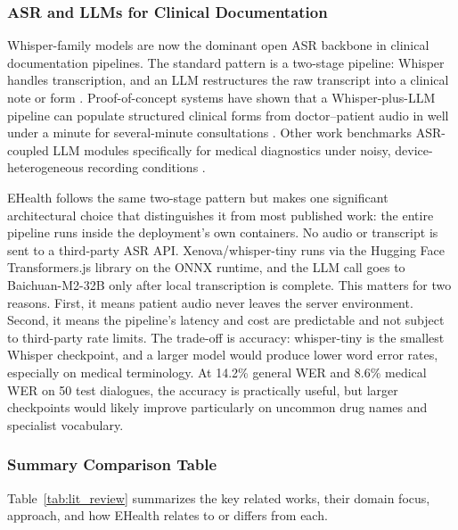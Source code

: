 \subsubsection{ASR and LLMs for Clinical Documentation}

Whisper-family models are now the dominant open ASR backbone in clinical documentation pipelines. The standard pattern is a two-stage pipeline: Whisper handles transcription, and an LLM restructures the raw transcript into a clinical note or form \cite{asr_healthcare_2026}. Proof-of-concept systems have shown that a Whisper-plus-LLM pipeline can populate structured clinical forms from doctor--patient audio in well under a minute for several-minute consultations \cite{llm_transcription_2024}. Other work benchmarks ASR-coupled LLM modules specifically for medical diagnostics under noisy, device-heterogeneous recording conditions \cite{asr_llm_benchmarking_2025}.

\noindent EHealth follows the same two-stage pattern but makes one significant architectural choice that distinguishes it from most published work: the entire pipeline runs inside the deployment's own containers. No audio or transcript is sent to a third-party ASR API. Xenova/whisper-tiny runs via the Hugging Face Transformers.js library on the ONNX runtime, and the LLM call goes to Baichuan-M2-32B only after local transcription is complete. This matters for two reasons. First, it means patient audio never leaves the server environment. Second, it means the pipeline's latency and cost are predictable and not subject to third-party rate limits. The trade-off is accuracy: whisper-tiny is the smallest Whisper checkpoint, and a larger model would produce lower word error rates, especially on medical terminology. At 14.2\% general WER and 8.6\% medical WER on 50 test dialogues, the accuracy is practically useful, but larger checkpoints would likely improve particularly on uncommon drug names and specialist vocabulary.

\subsubsection{Summary Comparison Table}

Table~\ref{tab:lit_review} summarizes the key related works, their domain focus, approach, and how EHealth relates to or differs from each.


